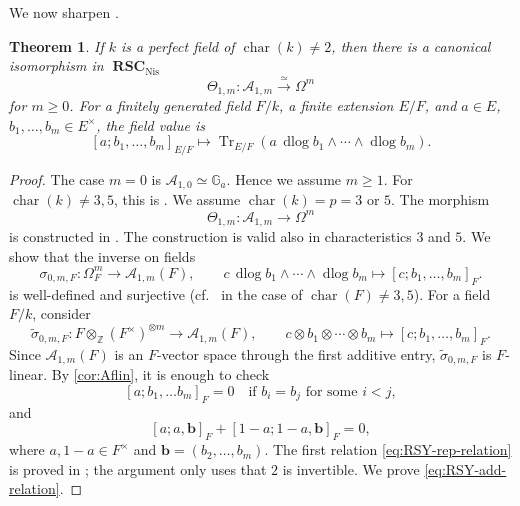 \documentclass[a4paper,12pt,reqno]{amsart}
\numberwithin{equation}{section}
\newtheorem{thm}{Theorem}[section]
\theoremstyle{definition}
\newcommand{\Z}{\mathbb{Z}}
\DeclareMathOperator{\dlog}{dlog}
\DeclareMathOperator{\Tr}{Tr}
\newcommand{\Ga}{\mathbb{G}_{a}}
\newcommand{\RSC}{{\operatorname{\mathbf{RSC}}}}
\newcommand{\Acal}{\mathcal{A}}
\newcommand{\Nis}{\mathrm{Nis}}
\newcommand{\vb}{\mathbf{b}}
\begin{document}
We now sharpen \cite[Theorem~5.19]{RSY22}. 
\begin{thm}\label{thm:one-additive}
If $k$ is a perfect field of $\operatorname{char}(k)\neq 2$, then 
there is a canonical isomorphism in $\RSC_{\Nis}$
\begin{equation}\label{eq:one-additive}
 \Theta_{1,m}:\Acal_{1,m}\xrightarrow{\simeq }\Omega^m
\end{equation}
for $m\geq0$. 
For a finitely generated field $F/k$, a finite extension $E/F$, and
$a\in E$, $b_1,\ldots,b_m\in E^\times$, the field value is
\begin{equation}\label{eq:one-additive-field}
 [a;b_1,\ldots,b_m]_{E/F}
 \mapsto
 \Tr_{E/F}\left(a\,\dlog b_1\wedge\cdots\wedge \dlog b_m\right).
\end{equation}
\end{thm}
\begin{proof}
The case $m=0$ is $\Acal_{1,0}\simeq\Ga$. Hence we assume $m\geq1$.
For $\operatorname{char}(k)\neq3,5$, this is \cite[Theorem~5.19]{RSY22}.  We assume
$\operatorname{char}(k)=p=3$ or $5$.
The morphism
\[
 \Theta_{1,m}:\Acal_{1,m}\to\Omega^m
\]
is constructed in \cite[proof of Theorem~5.19, (5.19.1)]{RSY22}.
The construction is valid also in characteristics $3$ and $5$.
We show that the inverse on fields 
\[ 
\sigma_{0,m,F}:\Omega_F^m\to\Acal_{1,m}(F),
 \qquad
 c\,\dlog b_1\wedge\cdots\wedge \dlog b_m
 \mapsto[c;b_1,\ldots,b_m]_F.
\]
is well-defined and surjective (cf.~\cite[Proposition~5.18]{RSY22} in the case of $\operatorname{char}(F) \neq 3,5$).
For a field $F/k$, consider
\[
 \widetilde \sigma_{0,m,F}:
 F\otimes_{\Z}(F^\times)^{\otimes m}\to\Acal_{1,m}(F),
 \qquad
 c\otimes b_1\otimes\cdots\otimes b_m
 \mapsto[c;b_1,\ldots,b_m]_F.
\]
Since $\Acal_{1,m}(F)$ is an $F$-vector space through the first additive
entry, $\widetilde \sigma_{0,m,F}$ is $F$-linear. 
By \autoref{cor:Aflin}, 
it is enough to check 
\begin{equation}\label{eq:RSY-rep-relation}
[a;b_1,\ldots b_m]_F = 0\quad  \mbox{if $b_i = b_j$ for some $i<j$}, 
\end{equation}
and
\begin{equation}\label{eq:RSY-add-relation}
 [a;a,\vb]_F+[1-a;1-a,\vb]_F=0,
\end{equation}
where $a,1-a\in F^\times$ and $\vb = (b_2,\ldots,b_m)$. 
The first relation \eqref{eq:RSY-rep-relation} is proved in
\cite[proof of Proposition~5.18, part~(ii)]{RSY22}; the argument only
uses that $2$ is invertible.  We prove \eqref{eq:RSY-add-relation}.


\end{proof}
\end{document}
